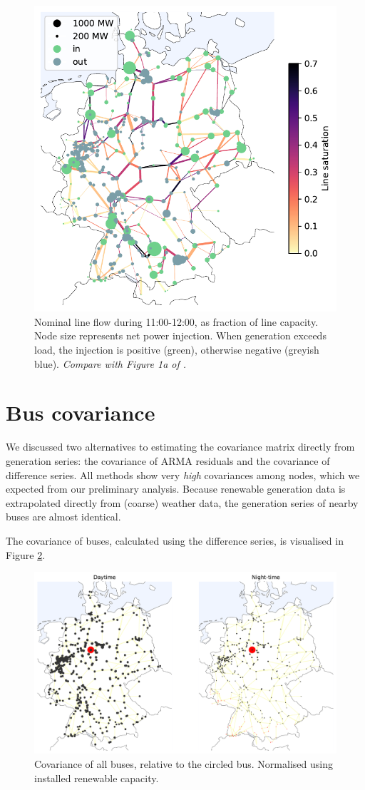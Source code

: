 \documentclass[main.tex]{subfiles}
\begin{document}
\begin{figure}[ht]
    \centering
    \includegraphics[width=.6\textwidth]{img/nominal_flow_and_injection.pdf}
    \caption{
    \label{fig:nominalflowandinjection}Nominal line flow during 11:00-12:00, as fraction of line capacity. Node size represents net power injection. When generation exceeds load, the injection is positive (green), otherwise negative (greyish blue). \emph{Compare with Figure 1a of \cite{Nesti2018emergentfailures}.}}
\end{figure}

\section{Bus covariance}
We discussed two alternatives to estimating the covariance matrix directly from generation series: the covariance of ARMA residuals and the covariance of difference series. All methods show very \emph{high} covariances among nodes, which we expected from our preliminary analysis. Because renewable generation data is extrapolated directly from (coarse) weather data, the generation series of nearby buses are almost identical. 

The covariance of buses, calculated using the difference series, is visualised in Figure \ref{fig:buscov}. 
\begin{figure}[ht]
    \centering
    \includegraphics[width=\textwidth]{img/bus_correlation_123_fullcov_day_and_night.pdf}
    \caption{
    \label{fig:buscov}Covariance of all buses, relative to the circled bus. Normalised using installed renewable capacity.}
\end{figure}
\end{document}
